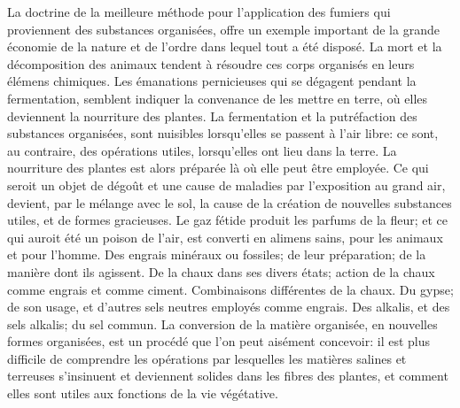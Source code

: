 La doctrine de la meilleure méthode pour l'application des fumiers qui proviennent des substances organisées, offre un exemple important\setcounter{page}{209} de la grande économie de la nature et de l’ordre dans lequel tout a été disposé. La mort et la décomposition des animaux tendent à résoudre ces corps organisés en leurs élémens chimiques. Les émanations pernicieuses qui se dégagent pendant la fermentation, semblent indiquer la convenance de les mettre en terre, où elles deviennent la nourriture des plantes. La fermentation et la putréfaction des substances organisées, sont nuisibles lorsqu’elles se passent à l’air libre: ce sont, au contraire, des opérations utiles, lorsqu’elles ont lieu dans la terre. La nourriture des plantes est alors préparée là où elle peut être employée. Ce qui seroit un objet de dégoût et une cause de maladies par l’exposition au grand air, devient, par le mélange avec le sol, la cause de la création de nouvelles substances utiles, et de formes gracieuses. Le gaz fétide produit les parfums de la fleur; et ce qui auroit été un poison de l’air, est converti en alimens sains, pour les animaux et pour l’homme.\setcounter{page}{210} Des engrais minéraux ou fossiles; de leur préparation; de la manière dont ils agissent. De la chaux dans ses divers états; action de la chaux comme engrais et comme ciment. Combinaisons différentes de la chaux. Du gypse; de son usage, et d'autres sels neutres employés comme engrais. Des alkalis, et des sels alkalis; du sel commun.
La conversion de la matière organisée, en nouvelles formes organisées, est un procédé que l'on peut aisément concevoir: il est plus difficile de comprendre les opérations par lesquelles les matières salines et terreuses s'insinuent et deviennent solides dans les fibres des plantes, et comment elles sont utiles aux fonctions de la vie végétative.
